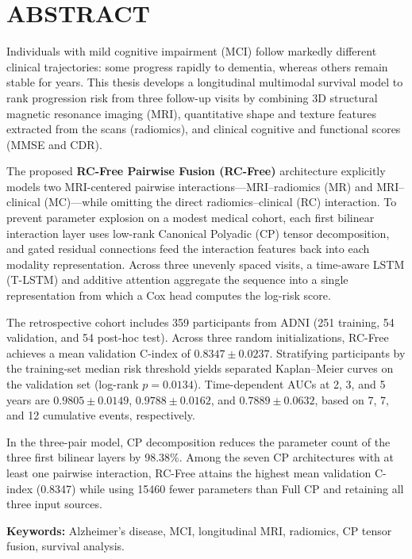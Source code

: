 \chapter*{ABSTRACT}

Individuals with mild cognitive impairment (MCI) follow markedly different clinical trajectories: some progress rapidly to dementia, whereas others remain stable for years. This thesis develops a longitudinal multimodal survival model to rank progression risk from three follow-up visits by combining 3D structural magnetic resonance imaging (MRI), quantitative shape and texture features extracted from the scans (radiomics), and clinical cognitive and functional scores (MMSE and CDR).

The proposed \textbf{RC-Free Pairwise Fusion (RC-Free)} architecture explicitly models two MRI-centered pairwise interactions---MRI--radiomics (MR) and MRI--clinical (MC)---while omitting the direct radiomics--clinical (RC) interaction. To prevent parameter explosion on a modest medical cohort, each first bilinear interaction layer uses low-rank Canonical Polyadic (CP) tensor decomposition, and gated residual connections feed the interaction features back into each modality representation. Across three unevenly spaced visits, a time-aware LSTM (T-LSTM) and additive attention aggregate the sequence into a single representation from which a Cox head computes the log-risk score.

The retrospective cohort includes 359 participants from ADNI (251 training, 54 validation, and 54 post-hoc test). Across three random initializations, RC-Free achieves a mean validation C-index of $0.8347\pm0.0237$. Stratifying participants by the training-set median risk threshold yields separated Kaplan--Meier curves on the validation set (log-rank $p=0.0134$). Time-dependent AUCs at 2, 3, and 5 years are $0.9805\pm0.0149$, $0.9788\pm0.0162$, and $0.7889\pm0.0632$, based on 7, 7, and 12 cumulative events, respectively.

In the three-pair model, CP decomposition reduces the parameter count of the three first bilinear layers by 98.38\%. Among the seven CP architectures with at least one pairwise interaction, RC-Free attains the highest mean validation C-index (0.8347) while using 15460 fewer parameters than Full CP and retaining all three input sources.

\noindent\textbf{Keywords:} Alzheimer's disease, MCI, longitudinal MRI, radiomics, CP tensor fusion, survival analysis.

